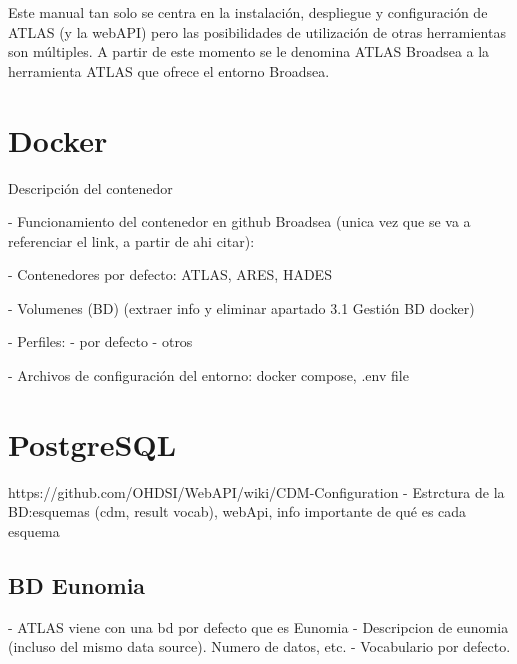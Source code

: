 Este manual tan solo se centra en la instalación, despliegue y configuración de ATLAS (y la webAPI) pero las posibilidades de utilización de otras herramientas son múltiples. A partir de este momento se le denomina ATLAS Broadsea a la herramienta ATLAS que ofrece el entorno Broadsea.

\section{Docker}

Descripción del contenedor

- Funcionamiento del contenedor en github Broadsea (unica vez que se va a referenciar el link, a partir de ahi citar):

- Contenedores por defecto: ATLAS, ARES, HADES

- Volumenes (BD) (extraer info y eliminar apartado 3.1 Gestión BD docker)

- Perfiles:
        - por defecto
        - otros

- Archivos de configuración del entorno: docker compose, .env file

\section{PostgreSQL}

https://github.com/OHDSI/WebAPI/wiki/CDM-Configuration
- Estrctura de la BD:esquemas (cdm, result vocab), webApi, info importante de qué es cada esquema


\subsection{BD Eunomia}

- ATLAS viene con una bd por defecto que es Eunomia
- Descripcion de eunomia (incluso del mismo data source). Numero de datos, etc.
- Vocabulario por defecto.


